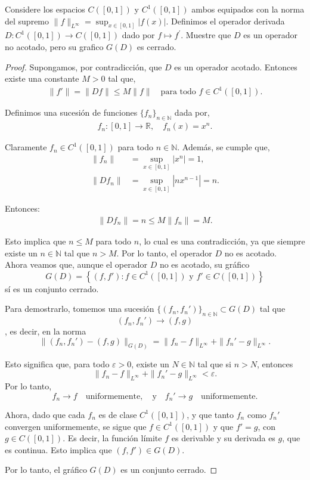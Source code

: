  Considere los espacios $C([0,1])$ y $C^1([0,1])$ ambos equipados con la norma del supremo $\|f\|_{L^\infty}=\displaystyle\sup_{x\in[0,1]}|f(x)|.$ Definimos el operador derivada $D:C^1([0,1])\to C([0,1])$ dado por $f\mapsto f^\prime.$ Muestre que $D$ es un operador no acotado, pero su grafico $G(D)$ es cerrado.

\begin{proof}
\hfill

Supongamos, por contradicción, que $D$ es un operador acotado. Entonces existe una constante $M > 0$ tal que,
\begin{align*}
    \|f'\| = \|Df\| \leq M\|f\| \quad \text{para todo } f \in C^{1}([0,1]).
\end{align*}

Definimos una sucesión de funciones $\{f_n\}_{n \in \mathbb{N}}$ dada por,
\begin{align*}
    f_n : [0,1] \to \mathbb{R}, \quad f_n(x) = x^n.
\end{align*}

Claramente $f_n \in C^1([0,1])$ para todo $n \in \mathbb{N}$. Además, se cumple que,
\begin{align*}
    \|f_n\| &= \sup_{x \in [0,1]} |x^n| = 1,\\
    \|Df_n\| &= \sup_{x \in [0,1]} |n x^{n-1}| = n.
\end{align*}

Entonces:
\begin{align*}
    \|Df_n\| = n \leq M \|f_n\| = M.
\end{align*}

Esto implica que $n \leq M$ para todo $n$, lo cual es una contradicción, ya que siempre existe un $n \in \mathbb{N}$ tal que $n > M$. Por lo tanto, el operador $D$ no es acotado.\\

Ahora veamos que, aunque el operador \( D \) no es acotado, su gráfico  
\[
G(D) = \left\{ (f, f') : f \in C^1([0,1]) \text{ y } f' \in C([0,1]) \right\}
\]  
sí es un conjunto cerrado.

Para demostrarlo, tomemos una sucesión \(\{(f_n, f_n')\}_{n \in \mathbb{N}} \subset G(D)\) tal que  
\[
(f_n, f_n') \to (f, g)
\]  
, es decir, en la norma  
\[
\|(f_n, f_n') - (f, g)\|_{G(D)} = \|f_n - f\|_{L^\infty} + \|f_n' - g\|_{L^\infty}.
\]

Esto significa que, para todo \(\varepsilon > 0\), existe un \(N \in \mathbb{N}\) tal que si \(n > N\), entonces  
\[
\|f_n - f\|_{L^\infty} + \|f_n' - g\|_{L^\infty} < \varepsilon.
\]  
Por lo tanto,  
\[
f_n \to f \quad \text{uniformemente}, \quad \text{y} \quad f_n' \to g \quad \text{uniformemente}.
\]

Ahora, dado que cada \(f_n\) es de clase \(C^1([0,1])\), y que tanto \(f_n\) como \(f_n'\) convergen uniformemente, se sigue que \(f \in C^1([0,1])\) y que \( f' = g \), con \( g \in C([0,1]) \). Es decir, la función límite \( f \) es derivable y su derivada es \( g \), que es continua. Esto implica que \((f, f') \in G(D)\).  

Por lo tanto, el gráfico \(G(D)\) es un conjunto cerrado.


\end{proof}